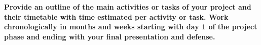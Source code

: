 \textbf{Provide an outline of the main activities or tasks of your project and their timetable with time estimated per
activity or task. Work chronologically in months and weeks starting with day 1 of the project phase and ending
with your final presentation and defense.}
\\
\\













